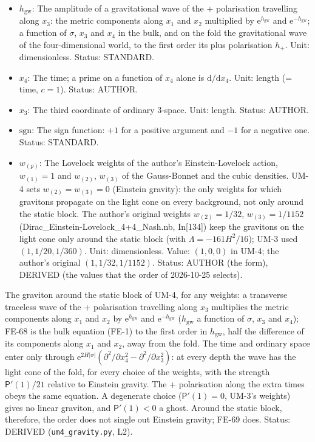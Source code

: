 \documentclass[
  10pt,
]{article}
\begin{document}
\begin{itemize}
  dimensions or of the fold). Status: STANDARD.
\item
  \(h_{\mathrm{gw}}\): The amplitude of a gravitational wave of the +
  polarisation travelling along \(x_3\): the metric components along
  \(x_1\) and \(x_2\) multiplied by \(\mathrm{e}^{h_{\mathrm{gw}}}\) and
  \(\mathrm{e}^{-h_{\mathrm{gw}}}\); a function of \(\sigma\), \(x_3\)
  and \(x_4\) in the bulk, and on the fold the gravitational wave of the
  four-dimensional world, to the first order its plus polarisation
  \(h_{+}\). Unit: dimensionless. Status: STANDARD.
\item
  \(x_4\): The time; a prime on a function of \(x_4\) alone is
  \(\mathrm{d}/\mathrm{d}x_4\). Unit: length (= time, \(c = 1\)).
  Status: AUTHOR.
\item
  \(x_3\): The third coordinate of ordinary 3-space. Unit: length.
  Status: AUTHOR.
\item
  \(\mathrm{sgn}\): The sign function: \(+1\) for a positive argument
  and \(-1\) for a negative one. Status: STANDARD.
\item
  \(w_{(p)}\): The Lovelock weights of the author's Einstein-Lovelock
  action, \(w_{(1)} = 1\) and \(w_{(2)}\), \(w_{(3)}\) of the
  Gauss-Bonnet and the cubic densities. UM-4 sets
  \(w_{(2)} = w_{(3)} = 0\) (Einstein gravity): the only weights for
  which gravitons propagate on the light cone on every background, not
  only around the static block. The author's original weights
  \(w_{(2)} = 1/32\), \(w_{(3)} = 1/1152\)
  (Dirac\_Einstein-Lovelock\_4+4\_Nash.nb, In{[}134{]}) keep the
  gravitons on the light cone only around the static block (with
  \(\Lambda = -161H^2/16\)); UM-3 used \((1, 1/20, 1/360)\). Unit:
  dimensionless. Value: \((1, 0, 0)\) in UM-4; the author's original
  \((1, 1/32, 1/1152)\). Status: AUTHOR (the form), DERIVED (the values
  that the order of 2026-10-25 selects).
\end{itemize}

The graviton around the static block of UM-4, for any weights: a
transverse traceless wave of the + polarisation travelling along \(x_3\)
multiplies the metric components along \(x_1\) and \(x_2\) by
\(\mathrm{e}^{h_{\mathrm{gw}}}\) and \(\mathrm{e}^{-h_{\mathrm{gw}}}\)
(\(h_{\mathrm{gw}}\) a function of \(\sigma\), \(x_3\) and \(x_4\));
FE-68 is the bulk equation (FE-1) to the first order in
\(h_{\mathrm{gw}}\), half the difference of its components along \(x_1\)
and \(x_2\), away from the fold. The time and ordinary space enter only
through
\(\mathrm{e}^{2H\lvert\sigma\rvert}(\partial^2/\partial x_4^2 - \partial^2/\partial x_3^2)\):
at every depth the wave has the light cone of the fold, for every choice
of the weights, with the strength \(\mathsf{P}'(1)/21\) relative to
Einstein gravity. The + polarisation along the extra times obeys the
same equation. A degenerate choice (\(\mathsf{P}'(1) = 0\), UM-3's
weights) gives no linear graviton, and \(\mathsf{P}'(1) < 0\) a ghost.
Around the static block, therefore, the order does not single out
Einstein gravity; FE-69 does. Status: DERIVED (\texttt{um4\_gravity.py},
L2).
\end{document}
